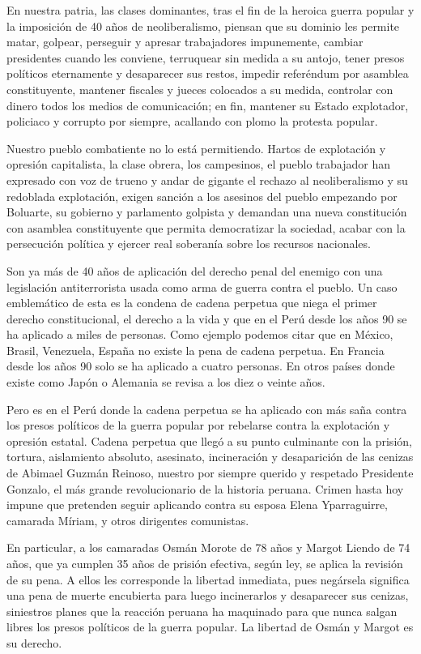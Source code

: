 \documentclass[
  a4paper,
]{article}
\begin{document}
En nuestra patria, las clases dominantes, tras el fin de la heroica
guerra popular y la imposición de 40 años de neoliberalismo, piensan que
su dominio les permite matar, golpear, perseguir y apresar trabajadores
impunemente, cambiar presidentes cuando les conviene, terruquear sin
medida a su antojo, tener presos políticos eternamente y desaparecer sus
restos, impedir referéndum por asamblea constituyente, mantener fiscales
y jueces colocados a su medida, controlar con dinero todos los medios de
comunicación; en fin, mantener su Estado explotador, policiaco y
corrupto por siempre, acallando con plomo la protesta popular.

Nuestro pueblo combatiente no lo está permitiendo. Hartos de explotación
y opresión capitalista, la clase obrera, los campesinos, el pueblo
trabajador han expresado con voz de trueno y andar de gigante el rechazo
al neoliberalismo y su redoblada explotación, exigen sanción a los
asesinos del pueblo empezando por Boluarte, su gobierno y parlamento
golpista y demandan una nueva constitución con asamblea constituyente
que permita democratizar la sociedad, acabar con la persecución política
y ejercer real soberanía sobre los recursos nacionales.

Son ya más de 40 años de aplicación del derecho penal del enemigo con
una legislación antiterrorista usada como arma de guerra contra el
pueblo. Un caso emblemático de esta es la condena de cadena perpetua que
niega el primer derecho constitucional, el derecho a la vida y que en el
Perú desde los años 90 se ha aplicado a miles de personas. Como ejemplo
podemos citar que en México, Brasil, Venezuela, España no existe la pena
de cadena perpetua. En Francia desde los años 90 solo se ha aplicado a
cuatro personas. En otros países donde existe como Japón o Alemania se
revisa a los diez o veinte años.

Pero es en el Perú donde la cadena perpetua se ha aplicado con más saña
contra los presos políticos de la guerra popular por rebelarse contra la
explotación y opresión estatal. Cadena perpetua que llegó a su punto
culminante con la prisión, tortura, aislamiento absoluto, asesinato,
incineración y desaparición de las cenizas de Abimael Guzmán Reinoso,
nuestro por siempre querido y respetado Presidente Gonzalo, el más
grande revolucionario de la historia peruana. Crimen hasta hoy impune
que pretenden seguir aplicando contra su esposa Elena Yparraguirre,
camarada Míriam, y otros dirigentes comunistas.

En particular, a los camaradas Osmán Morote de 78 años y Margot Liendo
de 74 años, que ya cumplen 35 años de prisión efectiva, según ley, se
aplica la revisión de su pena. A ellos les corresponde la libertad
inmediata, pues negársela significa una pena de muerte encubierta para
luego incinerarlos y desaparecer sus cenizas, siniestros planes que la
reacción peruana ha maquinado para que nunca salgan libres los presos
políticos de la guerra popular. La libertad de Osmán y Margot es su
derecho.
\end{document}
